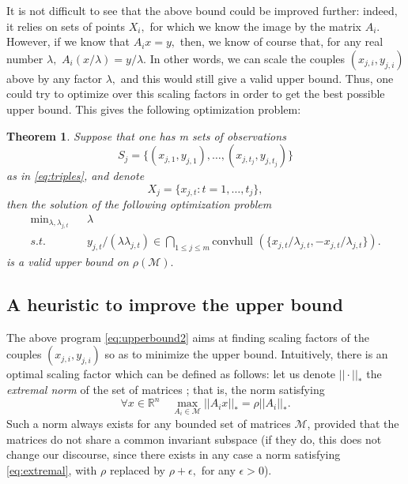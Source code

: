 \documentclass[letterpaper, 10 pt, conference]{ieeeconf}  %
\newcommand{\convhull}{\mbox{convhull } }
\newcommand{\re}{\mathbb{R}}
\newcommand{\cM}{\mathcal{M}}
\newtheorem{theorem}{Theorem}[section]
\begin{document}
It is not difficult to see that the above bound could be improved further: indeed, it relies on sets of points $X_i,$ for which we know the image by the matrix $A_i.$ However, if we know that $A_ix=y,$ then, we know of course that, for any real number $\lambda,$  $ A_i(x/\lambda)=y/\lambda.$ In other words, we can scale the couples $(x_{j,i},y_{j,i})$ above by any factor $\lambda,$ and this would still give a valid upper bound.  Thus, one could try to optimize over this scaling factors in order to get the best possible upper bound.
This gives the following optimization problem:

\begin{theorem}
Suppose that one has m sets of observations $$S_j=\{(x_{j,1}, y_{j,1}),\dots, (x_{j,t_j}, y_{j,t_j})\}$$ as in \eqref{eq:triples}, and denote $$X_j=\{x_{j,t}:t=1,\dots,t_j\},$$ then the solution of the following optimization problem
\begin{eqnarray} \label{eq:upperbound2}
\mbox{min}_{\lambda,\lambda_{j,t}} &&\lambda\\
\nonumber s.t.& &y_{j,t}/(\lambda \lambda_{j,t}) \in \bigcap_{1\leq j \leq m} \convhull{(\{x_{j,t}/\lambda_{j,t},-x_{j,t}/\lambda_{j,t}\})}.
\end{eqnarray}
is a valid upper bound on $\rho(\cM).$
\end{theorem}

\subsection{A heuristic to improve the upper bound}

The above program \eqref{eq:upperbound2} aims at finding scaling factors of the couples $(x_{j,i},y_{j,i})$ so as to minimize the upper bound.  Intuitively, there is an optimal scaling factor which can be defined as follows: let us denote $||\cdot||_*$ the \emph{extremal norm} of the set of matrices ; that is, the norm satisfying \begin{equation}\label{eq:extremal}\forall x\in \re^n \quad  \max_{A_i \in \cM}||A_ix||_*=\rho ||A_i||_*. \end{equation}  Such a norm always exists for any bounded set of matrices $\cM$, provided that the matrices do not share a common invariant subspace \cite[Section 2.1.2]{jungers_lncis} (if they do, this does not change our discourse, since there exists in any case a norm satisfying \eqref{eq:extremal}, with $\rho$ replaced by $\rho+\epsilon,$ for any $\epsilon>0$).
\end{document}
